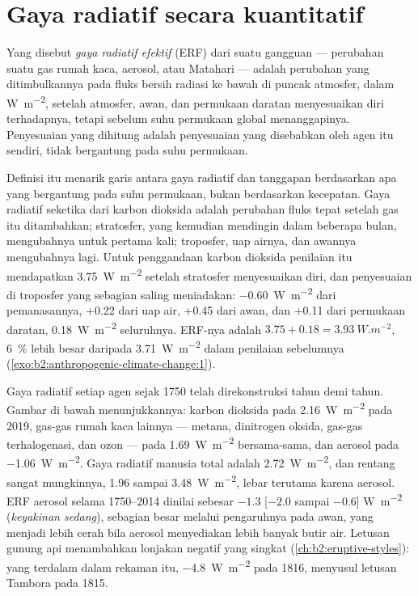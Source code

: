 \section{Gaya radiatif secara kuantitatif}\label{sec:b2:anthropogenic-climate-change:forcing}

\begin{definition}\label{def:b2:anthropogenic-climate-change:erf}
Yang disebut \emph{gaya radiatif efektif} (ERF) dari suatu gangguan
--- perubahan suatu gas rumah kaca, aerosol, atau Matahari --- adalah perubahan yang ditimbulkannya pada fluks bersih radiasi
ke bawah di puncak atmosfer, dalam \unit{W.m^{-2}}, setelah atmosfer,
awan, dan permukaan daratan menyesuaikan diri terhadapnya, tetapi sebelum suhu permukaan global
menanggapinya. Penyesuaian yang dihitung adalah penyesuaian yang disebabkan oleh agen itu sendiri, tidak bergantung pada
suhu permukaan.
\end{definition}

Definisi itu menarik garis antara gaya radiatif dan tanggapan berdasarkan apa yang bergantung pada suhu
permukaan, bukan berdasarkan kecepatan. Gaya radiatif seketika dari karbon dioksida adalah perubahan fluks tepat
setelah gas itu ditambahkan; stratosfer, yang kemudian mendingin dalam beberapa bulan, mengubahnya untuk pertama kali;
troposfer, uap airnya, dan awannya mengubahnya lagi. Untuk penggandaan karbon
dioksida penilaian itu mendapatkan \qty{3.75}{W.m^{-2}} setelah stratosfer menyesuaikan diri, dan
penyesuaian di troposfer yang sebagian saling meniadakan: \qty{-0.60}{W.m^{-2}} dari pemanasannya, +0.22
dari uap air, +0.45 dari awan, dan +0.11 dari permukaan daratan, \qty{+0.18}{W.m^{-2}} seluruhnya.
ERF-nya adalah $3.75 + 0.18 = \qty{3.93}{W.m^{-2}}$, \qty{6}{\percent} lebih besar daripada
\qty{3.71}{W.m^{-2}} dalam penilaian sebelumnya (\cref{exo:b2:anthropogenic-climate-change:1}).

Gaya radiatif setiap agen sejak 1750 telah direkonstruksi tahun demi tahun. Gambar di bawah menunjukkannya:
karbon dioksida pada \qty{2.16}{W.m^{-2}} pada 2019, gas-gas rumah kaca lainnya --- metana,
dinitrogen oksida, gas-gas terhalogenasi, dan ozon --- pada \qty{1.69}{W.m^{-2}} bersama-sama, dan
aerosol pada \qty{-1.06}{W.m^{-2}}. Gaya radiatif manusia total adalah \qty{2.72}{W.m^{-2}}, dan rentang
sangat mungkinnya, 1.96 sampai \qty{3.48}{W.m^{-2}}, lebar terutama karena aerosol. ERF aerosol selama
1750--2014 dinilai sebesar $-1.3$ [$-2.0$ sampai $-0.6$] \unit{W.m^{-2}} (\emph{keyakinan sedang}),
sebagian besar melalui pengaruhnya pada awan, yang menjadi lebih cerah bila aerosol menyediakan lebih banyak butir air.
Letusan gunung api menambahkan lonjakan negatif yang singkat (\cref{ch:b2:eruptive-styles}): yang terdalam dalam
rekaman itu, \qty{-4.8}{W.m^{-2}} pada 1816, menyusul letusan Tambora pada 1815.

